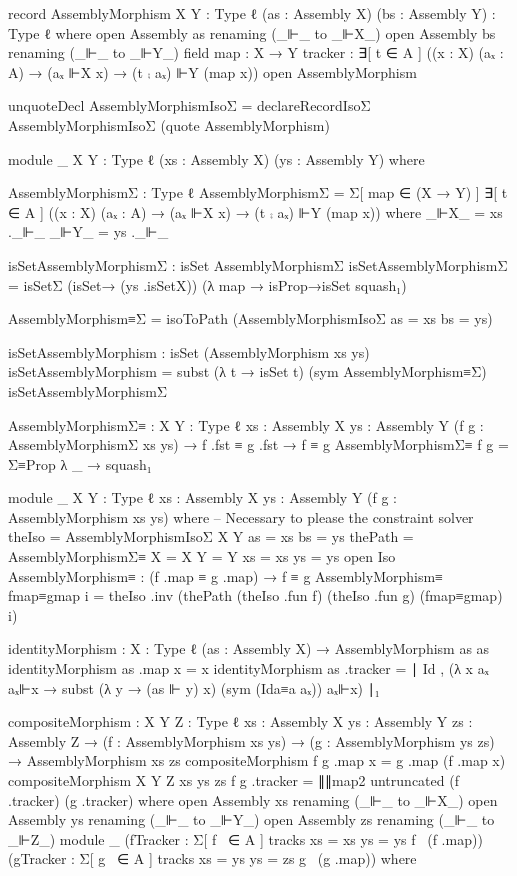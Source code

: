   record AssemblyMorphism {X Y : Type ℓ} (as : Assembly X) (bs : Assembly Y) : Type ℓ where
    open Assembly as renaming (_⊩_ to _⊩X_)
    open Assembly bs renaming (_⊩_ to _⊩Y_)
    field
      map : X → Y
      tracker : ∃[ t ∈ A ] ((x : X) (aₓ : A) → (aₓ ⊩X x) → (t ⨾ aₓ) ⊩Y (map x))
  open AssemblyMorphism

  unquoteDecl AssemblyMorphismIsoΣ = declareRecordIsoΣ AssemblyMorphismIsoΣ (quote AssemblyMorphism)

  module _ {X Y : Type ℓ} (xs : Assembly X) (ys : Assembly Y) where
    
    AssemblyMorphismΣ : Type ℓ
    AssemblyMorphismΣ = Σ[ map ∈ (X → Y) ] ∃[ t ∈ A ] ((x : X) (aₓ : A) → (aₓ ⊩X x) → (t ⨾ aₓ) ⊩Y (map x)) where
      _⊩X_ = xs ._⊩_
      _⊩Y_ = ys ._⊩_

    isSetAssemblyMorphismΣ : isSet AssemblyMorphismΣ
    isSetAssemblyMorphismΣ = isSetΣ (isSet→ (ys .isSetX)) (λ map → isProp→isSet squash₁)

    AssemblyMorphism≡Σ = isoToPath (AssemblyMorphismIsoΣ {as = xs} {bs = ys})

    isSetAssemblyMorphism : isSet (AssemblyMorphism xs ys)
    isSetAssemblyMorphism = subst (λ t → isSet t) (sym AssemblyMorphism≡Σ) isSetAssemblyMorphismΣ

  AssemblyMorphismΣ≡ : {X Y : Type ℓ}
                      {xs : Assembly X}
                      {ys : Assembly Y}
                      (f g : AssemblyMorphismΣ xs ys)
                      → f .fst ≡ g .fst
                      → f ≡ g
  AssemblyMorphismΣ≡ f g = Σ≡Prop λ _ → squash₁

  module _ {X Y : Type ℓ}
           {xs : Assembly X}
           {ys : Assembly Y}
           (f g : AssemblyMorphism xs ys) where
         -- Necessary to please the constraint solver
         theIso = AssemblyMorphismIsoΣ {X} {Y} {as = xs} {bs = ys}
         thePath = AssemblyMorphismΣ≡ {X = X} {Y = Y} {xs = xs} {ys = ys}
         open Iso
         AssemblyMorphism≡ : (f .map ≡ g .map) → f ≡ g
         AssemblyMorphism≡ fmap≡gmap i = theIso .inv (thePath (theIso .fun f) (theIso .fun g) (fmap≡gmap) i)

  identityMorphism : {X : Type ℓ} (as : Assembly X) → AssemblyMorphism as as
  identityMorphism as .map x = x
  identityMorphism as .tracker = ∣ Id , (λ x aₓ aₓ⊩x → subst (λ y → (as ⊩ y) x) (sym (Ida≡a aₓ)) aₓ⊩x) ∣₁

  compositeMorphism : {X Y Z : Type ℓ} {xs : Assembly X} {ys : Assembly Y} {zs : Assembly Z}
                    → (f : AssemblyMorphism xs ys)
                    → (g : AssemblyMorphism ys zs)
                    → AssemblyMorphism xs zs
  compositeMorphism f g .map x = g .map (f .map x)
  compositeMorphism {X} {Y} {Z} {xs} {ys} {zs} f g .tracker = ∥∥map2 untruncated (f .tracker) (g .tracker) where
                      open Assembly xs renaming (_⊩_ to _⊩X_)
                      open Assembly ys renaming (_⊩_ to _⊩Y_)
                      open Assembly zs renaming (_⊩_ to _⊩Z_)
                      module _ (fTracker : Σ[ f~ ∈ A ] tracks {xs = xs} {ys = ys} f~ (f .map))
                               (gTracker : Σ[ g~ ∈ A ] tracks {xs = ys} {ys = zs} g~ (g .map)) where
                               
